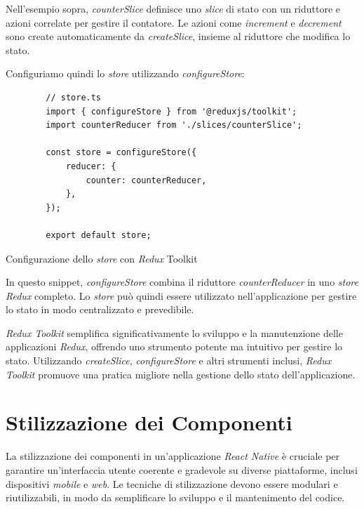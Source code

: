 Nell'esempio sopra, \textit{counterSlice} definisce uno \textit{slice} di stato con un riduttore e azioni correlate per gestire il contatore. 
Le azioni come \textit{increment} e \textit{decrement} sono create automaticamente da \textit{createSlice}, insieme al riduttore che modifica lo stato.

Configuriamo quindi lo \textit{store} utilizzando \textit{configureStore}:

\begin{listing}[H]
    \begin{verbatim}
        // store.ts
        import { configureStore } from '@reduxjs/toolkit';
        import counterReducer from './slices/counterSlice';

        const store = configureStore({
            reducer: {
                counter: counterReducer,
            },
        });

        export default store;
    \end{verbatim}
    \caption{Configurazione dello \textit{store} con \textit{Redux} Toolkit}
    \label{listing:redux_toolkit_store}
\end{listing}

In questo snippet, \textit{configureStore} combina il riduttore \textit{counterReducer} in uno \textit{store} \textit{Redux} completo.
Lo \textit{store} può quindi essere utilizzato nell'applicazione per gestire lo stato in modo centralizzato e prevedibile.

\textit{Redux Toolkit} semplifica significativamente lo sviluppo e la manutenzione delle applicazioni \textit{Redux}, offrendo uno strumento potente ma intuitivo per gestire lo stato.
Utilizzando \textit{createSlice}, \textit{configureStore} e altri strumenti inclusi, 
\textit{Redux Toolkit} promuove una pratica migliore nella gestione dello stato dell'applicazione.


\section{Stilizzazione dei Componenti}
\label{sec:stilizzazione_componenti}

La stilizzazione dei componenti in un'applicazione \textit{React Native} è cruciale per garantire un'interfaccia utente coerente e gradevole su diverse piattaforme, 
inclusi dispositivi \textit{mobile} e \textit{web}.
Le tecniche di stilizzazione devono essere modulari e riutilizzabili, in modo da semplificare lo sviluppo e il mantenimento del codice.

